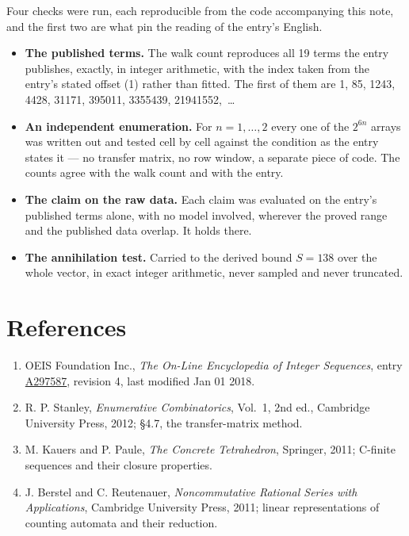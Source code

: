 \documentclass[11pt]{article}
\theoremstyle{definition}
\begin{document}
Four checks were run, each reproducible from the code accompanying this note, and the first two are what pin the reading of the entry's English.

\begin{itemize}

\item {\bfseries The published terms.} The walk count reproduces all 19 terms the entry publishes, exactly, in integer arithmetic, with the index taken from the entry's stated offset (1) rather than fitted. The first of them are 1, 85, 1243, 4428, 31171, 395011, 3355439, 21941552,~\dots

\item {\bfseries An independent enumeration.} For $n = 1,\dots,2$ every one of the $2^{6n}$ arrays was written out and tested cell by cell against the condition as the entry states it --- no transfer matrix, no row window, a separate piece of code. The counts agree with the walk count and with the entry.

\item {\bfseries The claim on the raw data.} Each claim was evaluated on the entry's published terms alone, with no model involved, wherever the proved range and the published data overlap. It holds there.

\item {\bfseries The annihilation test.} Carried to the derived bound $S = 138$ over the whole vector, in exact integer arithmetic, never sampled and never truncated.

\end{itemize}

\section{References}

\begin{enumerate}

\item OEIS Foundation Inc., \emph{The On-Line Encyclopedia of Integer Sequences}, entry \href{https://oeis.org/A297587}{A297587}, revision 4, last modified Jan 01 2018.

\item R. P. Stanley, \emph{Enumerative Combinatorics}, Vol.~1, 2nd ed., Cambridge University Press, 2012; \S4.7, the transfer-matrix method.

\item M. Kauers and P. Paule, \emph{The Concrete Tetrahedron}, Springer, 2011; C-finite sequences and their closure properties.

\item J. Berstel and C. Reutenauer, \emph{Noncommutative Rational Series with Applications}, Cambridge University Press, 2011; linear representations of counting automata and their reduction.

\end{enumerate}
\end{document}
